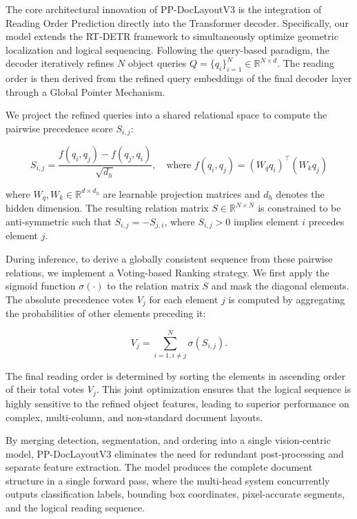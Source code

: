 \documentclass[11pt, a4paper,logo,  copyright, nonumbering]{paddleocr}
\begin{document}
The core architectural innovation of PP-DocLayoutV3 is the integration of Reading Order Prediction directly into the Transformer decoder. Specifically, our model extends the RT-DETR framework to simultaneously optimize geometric localization and logical sequencing. Following the query-based paradigm, the decoder iteratively refines $N$ object queries $Q = \{q_i\}_{i=1}^N \in \mathbb{R}^{N \times d}$. The reading order is then derived from the refined query embeddings of the final decoder layer through a Global Pointer Mechanism.


We project the refined queries into a shared relational space to compute the pairwise precedence score $S_{i,j}$:

\begin{equation}
    S_{i,j} = \frac{f(q_i, q_j) - f(q_j, q_i)}{\sqrt{d_h}}, \quad \text{where } f(q_i, q_j) = (W_q q_i)^\top (W_k q_j)
\end{equation}

where $W_q, W_k \in \mathbb{R}^{d \times d_h}$ are learnable projection matrices and $d_h$ denotes the hidden dimension. The resulting relation matrix $S \in \mathbb{R}^{N \times N}$ is constrained to be anti-symmetric such that $S_{i,j} = -S_{j,i}$, where $S_{i,j} > 0$ implies element $i$ precedes element $j$.

During inference, to derive a globally consistent sequence from these pairwise relations, we implement a Voting-based Ranking strategy. We first apply the sigmoid function $\sigma(\cdot)$ to the relation matrix $S$ and mask the diagonal elements. The absolute precedence votes $V_j$ for each element $j$ is computed by aggregating the probabilities of other elements preceding it:

\begin{equation}
    V_j = \sum_{i=1, i \neq j}^{N} \sigma(S_{i,j}).
\end{equation}

The final reading order is determined by sorting the elements in ascending order of their total votes $V_j$. This joint optimization ensures that the logical sequence is highly sensitive to the refined object features, leading to superior performance on complex, multi-column, and non-standard document layouts.

By merging detection, segmentation, and ordering into a single vision-centric model, PP-DocLayoutV3 eliminates the need for redundant post-processing and separate feature extraction. The model produces the complete document structure in a single forward pass, where the multi-head system concurrently outputs classification labels, bounding box coordinates, pixel-accurate segments, and the logical reading sequence.
\end{document}
